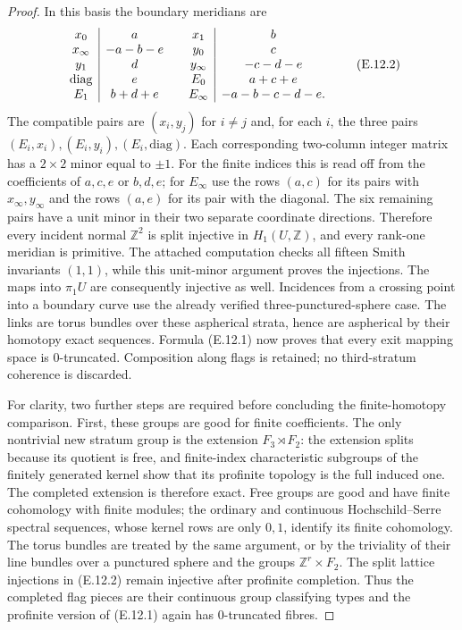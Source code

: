 \begin{proof}
In this basis the boundary meridians are
\[
\begin{array}{c|c@{\qquad}c|c}
 x_0&a&x_1&b\\
 x_\infty&-a-b-e&y_0&c\\
 y_1&d&y_\infty&-c-d-e\\
 \mathrm{diag}&e&E_0&a+c+e\\
 E_1&b+d+e&E_\infty&-a-b-c-d-e.
\end{array}                                             \tag{E.12.2}
\]
The compatible pairs are $(x_i,y_j)$ for $i\ne j$ and, for each $i$, the three pairs $(E_i,x_i),(E_i,y_i),(E_i,\mathrm{diag})$. Each corresponding two-column integer matrix has a $2\times2$ minor equal to $\pm1$. For the finite indices this is read off from the coefficients of $a,c,e$ or $b,d,e$; for $E_\infty$ use the rows $(a,c)$ for its pairs with $x_\infty,y_\infty$ and the rows $(a,e)$ for its pair with the diagonal. The six remaining pairs have a unit minor in their two separate coordinate directions. Therefore every incident normal $\mathbb Z^2$ is split injective in $H_1(U,\mathbb Z)$, and every rank-one meridian is primitive. The attached computation checks all fifteen Smith invariants $(1,1)$, while this unit-minor argument proves the injections. The maps into $\pi_1U$ are consequently injective as well. Incidences from a crossing point into a boundary curve use the already verified three-punctured-sphere case. The links are torus bundles over these aspherical strata, hence are aspherical by their homotopy exact sequences. Formula (E.12.1) now proves that every exit mapping space is $0$-truncated. Composition along flags is retained; no third-stratum coherence is discarded.

For clarity, two further steps are required before concluding the finite-homotopy comparison. First, these groups are good for finite coefficients. The only nontrivial new stratum group is the extension $F_3\rtimes F_2$: the extension splits because its quotient is free, and finite-index characteristic subgroups of the finitely generated kernel show that its profinite topology is the full induced one. The completed extension is therefore exact. Free groups are good and have finite cohomology with finite modules; the ordinary and continuous Hochschild--Serre spectral sequences, whose kernel rows are only $0,1$, identify its finite cohomology. The torus bundles are treated by the same argument, or by the triviality of their line bundles over a punctured sphere and the groups $\mathbb Z^r\times F_2$. The split lattice injections in (E.12.2) remain injective after profinite completion. Thus the completed flag pieces are their continuous group classifying types and the profinite version of (E.12.1) again has $0$-truncated fibres.


\end{proof}
